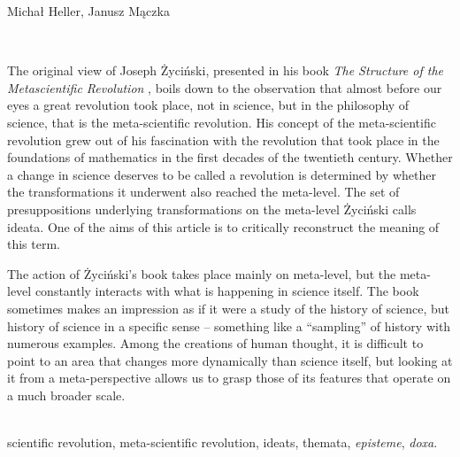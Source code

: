 \begin{newrevplenv2auth}{Michał Heller, Janusz Mączka}


\vspace{5mm}%
\begin{flushright}
{\chaptitleeng\color{black!50}{Ideals and ideats}}
\end{flushright}

{}\\
{
The original view of Joseph Życiński, presented in his book \textit{The Structure of the Metascientific Revolution} \parencite*[][]{zycinski_structure_1988}, boils down to the observation that almost before our eyes a great revolution took place, not in science, but in the philosophy of science, that is the meta-scientific revolution. His concept of the meta-scientific revolution grew out of his fascination with the revolution that took place in the foundations of mathematics in the first decades of the twentieth century. Whether a change in science deserves to be called a revolution is determined by whether the transformations it underwent also reached the meta-level. The set of presuppositions underlying transformations on the meta-level Życiński calls ideata. One of the aims of this article is to critically reconstruct the meaning of this term.

The action of Życiński's book takes place mainly on meta-level, but the meta-level constantly interacts with what is happening in science itself. The book sometimes makes an impression as if it were a study of the history of science, but history of science in a specific sense – something like a ``sampling'' of history with numerous examples. Among the creations of human thought, it is difficult to point to an area that changes more dynamically than science itself, but looking at it from a meta-perspective allows us to grasp those of its features that operate on a much broader scale.
}\par%
\vspace{2mm}%
{}\\%
{
scientific revolution, meta-scientific revolution, ideats, themata, \textit{episteme}, \textit{doxa}.
}%


\end{newrevplenv2auth}
